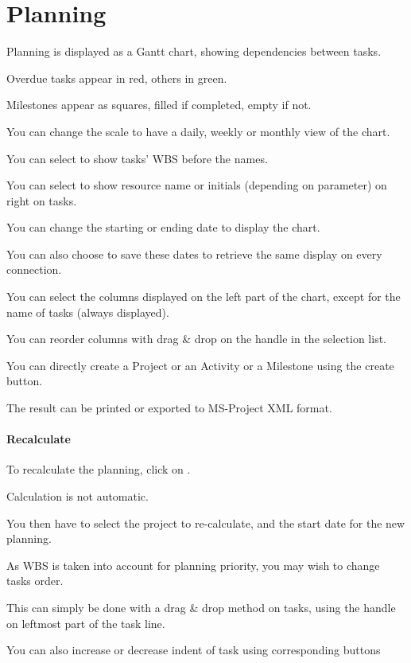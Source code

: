 \documentclass[letterpaper,10pt,english]{sphinxmanual}
\begin{document}

\section{Planning}
\label{Gantt:planning}\label{Gantt:index-1}
Planning is displayed as a Gantt chart, showing dependencies between tasks.

Overdue tasks appear in red, others in green.

Milestones appear as squares, filled if completed, empty if not.

You can change the scale to have a daily, weekly or monthly view of the chart.

You can select to show tasks’ WBS before the names.

You can select to show resource name or initials (depending on parameter) on right on tasks.

You can change the starting                                   or ending                                  date to display the chart.

You can also choose to save these dates                      to retrieve the same display on every connection.

You can select the columns displayed on the left part of the chart, except for the name of tasks (always displayed).

You can reorder columns with drag \& drop on the handle in the selection list.

You can directly create a Project or an Activity or a Milestone using the           create button.

The result can be printed        or exported to MS-Project XML format.
\paragraph{Recalculate}

To recalculate the planning, click on         .

Calculation is not automatic.

You then have to select the project to re-calculate, and the start date for the new planning.

As WBS is taken into account for planning priority, you may wish to change tasks order.

This can simply be done with a drag \& drop method on tasks, using the handle on leftmost part of the task line.

You can also increase or decrease indent of task using corresponding buttons
\end{document}
